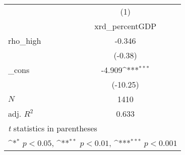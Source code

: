 {
\def\sym#1{\ifmmode^{#1}\else\(^{#1}\)\fi}
\begin{tabular}{l*{1}{c}}
\toprule
            &\multicolumn{1}{c}{(1)}\\
            &\multicolumn{1}{c}{xrd\_percentGDP}\\
\midrule
rho\_high    &      -0.346         \\
            &     (-0.38)         \\
\addlinespace
\_cons      &      -4.909\sym{***}\\
            &    (-10.25)         \\
\midrule
\(N\)       &        1410         \\
adj. \(R^{2}\)&       0.633         \\
\bottomrule
\multicolumn{2}{l}{\footnotesize \textit{t} statistics in parentheses}\\
\multicolumn{2}{l}{\footnotesize \sym{*} \(p<0.05\), \sym{**} \(p<0.01\), \sym{***} \(p<0.001\)}\\
\end{tabular}
}
